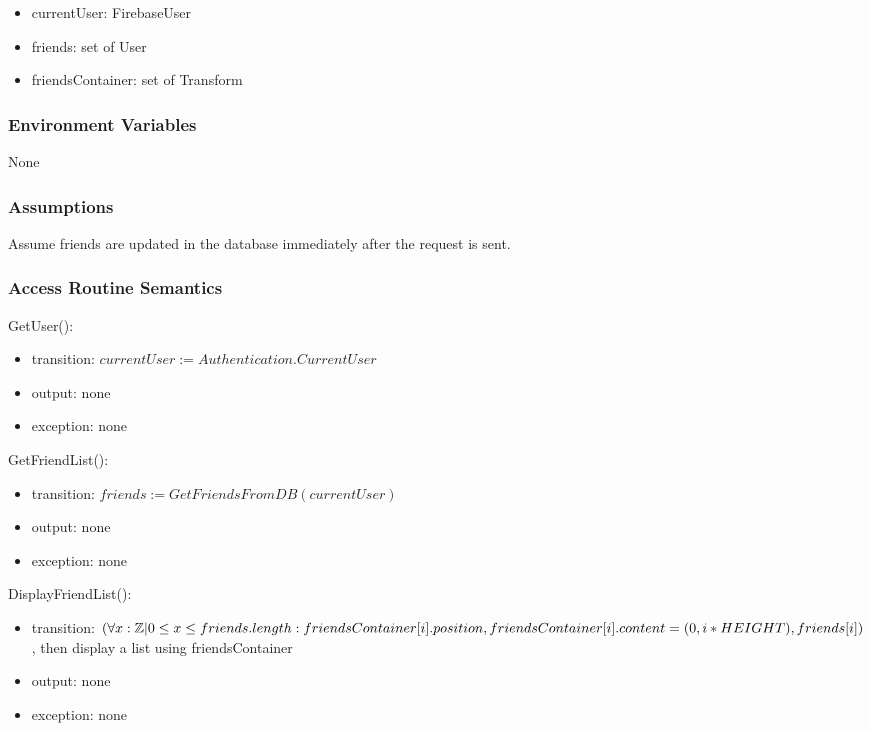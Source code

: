 \documentclass[12pt, titlepage]{article}
\begin{document}
\begin{itemize}
\item currentUser: FirebaseUser
\item friends: set of User
\item friendsContainer: set of Transform
\end{itemize}

\subsubsection{Environment Variables}

None

\subsubsection{Assumptions}

Assume friends are updated in the database immediately after the request is sent.

\subsubsection{Access Routine Semantics}

\noindent GetUser():
\begin{itemize}
\item transition: $currentUser := Authentication.CurrentUser$
\item output: none
\item exception: none
\end{itemize}

\noindent GetFriendList():
\begin{itemize}
\item transition: $friends := GetFriendsFromDB(currentUser)$ 
\item output: none
\item exception: none
\end{itemize}

\noindent DisplayFriendList():
\begin{itemize}
\item transition: $(\forall x : \mathbb{Z} | 0 \leq x \leq friends.length:\\ friendsContainer[i].position, friendsContainer[i].content = (0, i*HEIGHT), friends[i])$, then display a list using friendsContainer
\item output: none
\item exception: none
\end{itemize}
\end{document}
